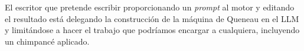 \documentclass[11pt,a4paper]{article}
\begin{document}
El escritor que pretende escribir proporcionando un \emph{prompt} al motor y editando el resultado está delegando la construcción de la máquina de Queneau en el LLM y limitándose a hacer el trabajo que podríamos encargar a cualquiera, incluyendo un chimpancé aplicado. 

%


 
\end{document}
